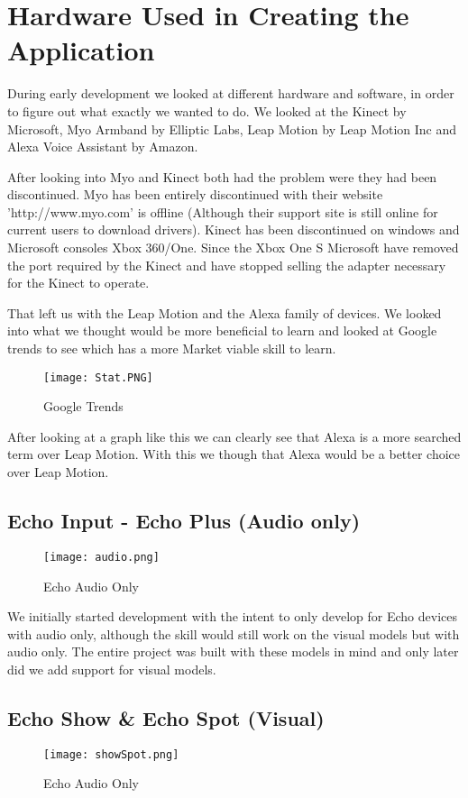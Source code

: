 \chapter{Hardware Used in Creating the Application}
During early development we looked at different hardware and software, in order to figure out what exactly we wanted to do.
We looked at the Kinect by Microsoft, Myo Armband by Elliptic Labs, Leap Motion by Leap Motion Inc and Alexa Voice Assistant by Amazon.

After looking into Myo and Kinect both had the problem were they had been discontinued. Myo has been entirely discontinued with their  website 'http://www.myo.com' is offline (Although their support site is still online for current users to download drivers). 
Kinect has been discontinued on windows and Microsoft consoles Xbox 360/One. Since the Xbox One S Microsoft have removed the port required by the Kinect and have stopped selling the adapter necessary for the Kinect to operate.

That left us with the Leap Motion and the Alexa family of devices.
We looked into what we thought would be more beneficial to learn and looked at Google trends to see which has a more Market viable skill to learn.

\begin{figure}[h!]
  \texttt{[image: Stat.PNG]}
  \caption{Google Trends}
  \label{fig:googletrends}
\end{figure}

After looking at a graph like this we can clearly see that Alexa is a more searched term over Leap Motion. With this we though that Alexa would be a better choice over Leap Motion.

\section{Echo Input - Echo Plus (Audio only)}
\begin{figure}[h!]
  \texttt{[image: audio.png]}
  \caption{Echo Audio Only}
  \label{fig:echoaudioonly}
\end{figure}

We initially started development with the intent to only develop for Echo devices with audio only, although the skill would still work on the visual models but with audio only. The entire project was built with these models in mind and only later did we add support for visual models.

\section{Echo Show \& Echo Spot (Visual)}
\begin{figure}[h!]
  \texttt{[image: showSpot.png]}
  \caption{Echo Audio Only}
  \label{fig:echoaudioonly}
\end{figure}

